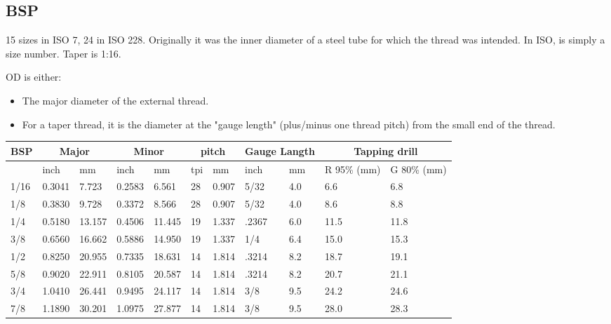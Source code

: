 \subsection{BSP}
15 sizes in ISO 7, 24 in ISO 228.  Originally it was the inner diameter of a steel tube for which the thread was intended. In ISO, is simply a size number.  Taper is 1:16.

OD is either:
\begin{itemize}
    \item The major diameter of the external thread.
    \item For a taper thread, it is the diameter at the "gauge length" (plus/minus one thread pitch) from the small end of the thread.
\end{itemize}


\begin{table}[h!]
    \footnotesize
\begin{longtable}{l|ll|ll|ll|ll|ll}
    BSP
    &\multicolumn{2}{c}{Major}
    &\multicolumn{2}{c}{Minor}
    &\multicolumn{2}{c}{pitch}
    &\multicolumn{2}{c}{Gauge Langth}
    &\multicolumn{2}{c}{Tapping drill}
    \\
    \hline
    &inch
    &mm
    &inch
    &mm
    &tpi
    &mm
    &inch
    &mm
    &R 95\% (mm)
    &G 80\% (mm)
    \\
\hline
      1/16&    0.3041&     7.723&    0.2583&     6.561&        28&     0.907&      5/32&       4.0&       6.6&       6.8\\
       1/8&    0.3830&     9.728&    0.3372&     8.566&        28&     0.907&      5/32&       4.0&       8.6&       8.8\\
       1/4&    0.5180&    13.157&    0.4506&    11.445&        19&     1.337&     .2367&       6.0&      11.5&      11.8\\
       3/8&    0.6560&    16.662&    0.5886&    14.950&        19&     1.337&       1/4&       6.4&      15.0&      15.3\\
       1/2&    0.8250&    20.955&    0.7335&    18.631&        14&     1.814&     .3214&       8.2&      18.7&      19.1\\
       5/8&    0.9020&    22.911&    0.8105&    20.587&        14&     1.814&     .3214&       8.2&      20.7&      21.1\\
       3/4&    1.0410&    26.441&    0.9495&    24.117&        14&     1.814&       3/8&       9.5&      24.2&      24.6\\
       7/8&    1.1890&    30.201&    1.0975&    27.877&        14&     1.814&       3/8&       9.5&      28.0&      28.3\\

\end{longtable}
\end{table}

